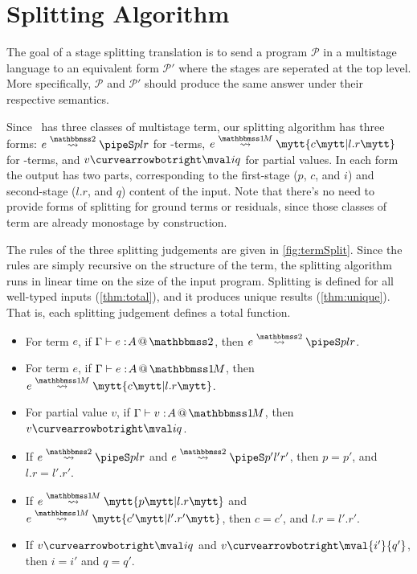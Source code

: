 
\section{Splitting Algorithm}
\label{sec:splitting}

\begin{abstrsyn}

The goal of a stage splitting translation 
is to send a program $\mathcal P$ in a multistage language
to an equivalent form $\mathcal P'$ where the stages are seperated at the top level.
More specifically, $\mathcal P$ and $\mathcal P'$ should produce 
the same answer under their respective semantics.

Since \lang\ has three classes of multistage term, 
our splitting algorithm has three forms: 
$\splittwo e A p l r$ for \bbtwo-terms, 
$\splitone e A c {l.r}$ for \bbonem-terms, and 
\mbox{$v \vsplito \mval i q$} for partial values.
In each form the output has two parts, corresponding to the
first-stage ($p$, $c$, and $i$) and second-stage ($l.r$, and $q$) content of the input.
Note that there's no need to provide forms of splitting for ground terms or residuals,
since those classes of term are already monostage by construction.

The rules of the three splitting judgements are given in \ref{fig:termSplit}.
Since the rules are simply recursive on the structure of the term, 
the splitting algorithm runs in linear time on the size of the input program.
Splitting is defined for all well-typed inputs (\ref{thm:total}), and it produces unique results (\ref{thm:unique}).
That is, each splitting judgement defines a total function.

\begin{theorem}  \leavevmode
\label{thm:total} 
\vspace{-0.75em}
\begin{itemize} 
\item For term $e$, if $\typestwo e A$, then $\splittwo e A p l r$. 
\item For term $e$, if $\typesone e A$, then $\splitone e A c {l.r}$.
\item For partial value $v$, if $\typesone v A$, then $v \vsplito \mval i q$.
\end{itemize}
\end{theorem}

\begin{theorem}  \leavevmode
\label{thm:unique}
\vspace{-0.75em}
\begin{itemize} 
\item If $\splittwo e A p l r$ and $\splittwo e A {p'} {l'} {r'}$, then $p = p'$, and $l.r = l'.r'$.
\item If $\splitone e A p {l.r}$ and $\splitone e A {c'} {l'.r'}$, then $c = c'$, and $l.r = l'.r'$.
\item If $v \vsplito \mval i q$ and $v \vsplito \mval {i'} {q'}$, then $i = i'$ and $q = q'$.
\end{itemize}
\end{theorem}


\end{abstrsyn}
